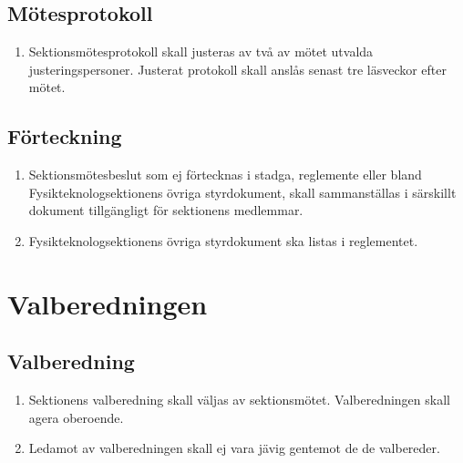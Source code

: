 \documentclass[11pt,a4paper]{article}
\begin{document}
\subsection{Mötesprotokoll}

\begin{enumerate}[\thesubsection .1]

  \item Sektionsmötesprotokoll skall justeras av två av mötet utvalda
  justeringspersoner. Justerat protokoll skall anslås senast tre
  läsveckor efter mötet.

\end{enumerate}


\subsection{Förteckning}

\begin{enumerate}[\thesubsection .1]

  \item Sektionsmötesbeslut som ej förtecknas i stadga, reglemente eller bland Fysikteknologsektionens övriga styrdokument, skall sammanställas i särskillt dokument tillgängligt för sektionens medlemmar.

\item Fysikteknologsektionens övriga styrdokument ska listas i reglementet.
\end{enumerate}

\newpage



\section{Valberedningen}

\subsection{Valberedning}

\begin{enumerate}[\thesubsection .1]

  \item Sektionens valberedning skall väljas av sektionsmötet. Valberedningen skall agera oberoende.
  
  \item Ledamot av valberedningen skall ej vara jävig gentemot de de valbereder.

\end{enumerate}
\end{document}
